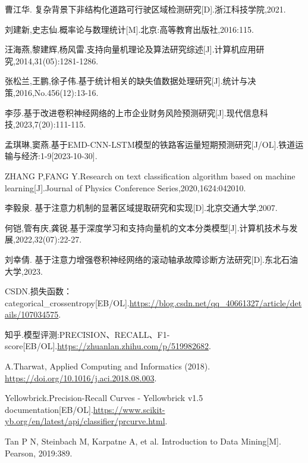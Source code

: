 \documentclass{MathorCupmodeling}
\begin{document}
	\begin{spacing}{1.08}
	\begin{thebibliography}{99}
	曹江华. 复杂背景下非结构化道路可行驶区域检测研究[D].浙江科技学院,2021.

	刘建新,史志仙.概率论与数理统计[M].北京:高等教育出版社,2016:115.

	汪海燕,黎建辉,杨风雷.支持向量机理论及算法研究综述[J].计算机应用研究,2014,31(05):1281-1286.

	张松兰,王鹏,徐子伟.基于统计相关的缺失值数据处理研究[J].统计与决策,2016,No.456(12):13-16.

	李莎.基于改进卷积神经网络的上市企业财务风险预测研究[J].现代信息科技,2023,7(20):111-115.

	孟琪琳,窦燕.基于EMD-CNN-LSTM模型的铁路客运量短期预测研究[J/OL].铁道运输与经济:1-9[2023-10-30].

	ZHANG P,FANG Y.Research on text classification algorithm based on machine learning[J].Journal of Physics Conference Series,2020,1624:042010.

	李毅泉. 基于注意力机制的显著区域提取研究和实现[D].北京交通大学,2007.

	何铠,管有庆,龚锐.基于深度学习和支持向量机的文本分类模型[J].计算机技术与发展,2022,32(07):22-27.

	刘幸倩. 基于注意力增强卷积神经网络的滚动轴承故障诊断方法研究[D].东北石油大学,2023.

	CSDN.损失函数：categorical\_crossentropy[EB/OL].\url{https://blog.csdn.net/qq_40661327/article/details/107034575}.

	知乎.模型评测:PRECISION、RECALL、F1-score[EB/OL].\url{https://zhuanlan.zhihu.com/p/519982682}.

	A.Tharwat, Applied Computing and Informatics (2018). \url{https://doi.org/10.1016/j.aci.2018.08.003}.

	Yellowbrick.Precision-Recall Curves - Yellowbrick v1.5 documentation[EB/OL].\url{https://www.scikit-yb.org/en/latest/api/classifier/prcurve.html}.

	Tan P N, Steinbach M, Karpatne A, et al. Introduction to Data Mining[M]. Pearson, 2019:389.
	\end{thebibliography}
	\end{spacing}
	\newpage
\end{document}
